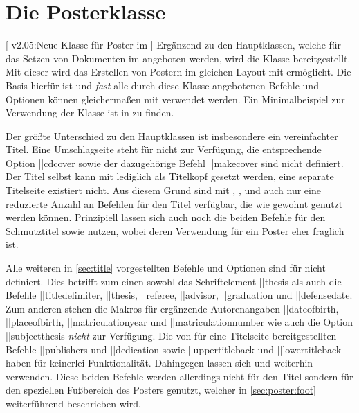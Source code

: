 \chapter[Die Posterklasse \Class*{tudscrposter}]{%
  Die Posterklasse%
}
%
\begin{DeclareEntity}{}[%
  v2.05:Neue Klasse für Poster im \TUDCD%
]
%
Ergänzend zu den Hauptklassen, welche für das Setzen von Dokumenten im \TUDCD 
angeboten werden, wird die Klasse  bereitgestellt. Mit 
dieser wird das Erstellen von Postern im gleichen Layout mit  
ermöglicht. Die Basis hierfür ist  und \emph{fast} alle 
durch diese Klasse angebotenen Befehle und Optionen können gleichermaßen mit 
 verwendet werden. Ein Minimalbeispiel zur Verwendung der 
Klasse ist in  zu finden.

Der größte Unterschied zu den Hauptklassen ist insbesondere ein vereinfachter 
Titel. Eine Umschlagseite steht für  nicht zur Verfügung, 
die entsprechende Option \Option||{cdcover} sowie der dazugehörige Befehl 
\Macro||{makecover} sind nicht definiert. Der Titel selbst kann mit 
 lediglich als Titelkopf gesetzt werden, eine separate 
Titelseite existiert nicht. Aus diesem Grund sind mit , 
,  und  auch nur eine 
reduzierte Anzahl an Befehlen für den Titel verfügbar, die wie gewohnt genutzt 
werden können. Prinzipiell lassen sich auch noch die beiden Befehle für den 
Schmutztitel  sowie  nutzen, wobei deren 
Verwendung für ein Poster eher fraglich ist.

Alle weiteren in \autoref{sec:title} vorgestellten Befehle und Optionen sind 
für  nicht definiert. Dies betrifft zum einen sowohl das 
Schriftelement \Font||{thesis} als auch die Befehle \Macro||{titledelimiter}, 
\Macro||{thesis}, \Macro||{referee}, \Macro||{advisor}, \Macro||{graduation} 
und \Macro||{defensedate}. Zum anderen stehen die Makros für ergänzende 
Autorenangaben \Macro||{dateofbirth}, \Macro||{placeofbirth}, 
\Macro||{matriculationyear} und \Macro||{matriculationnumber} wie auch 
die Option \Option||{subjectthesis} \emph{nicht} zur Verfügung. Die von 
\KOMAScript für eine Titelseite bereitgestellten Befehle \Macro||{publishers} 
und \Macro||{dedication} sowie \Macro||{uppertitleback} und 
\Macro||{lowertitleback} haben für  keinerlei 
Funktionalität. Dahingegen lassen sich  und  
weiterhin verwenden. Diese beiden Befehle werden allerdings nicht für den Titel 
sondern für den speziellen Fußbereich des Posters genutzt, welcher in 
\autoref{sec:poster:foot} weiterführend beschrieben wird.


\end{DeclareEntity}
